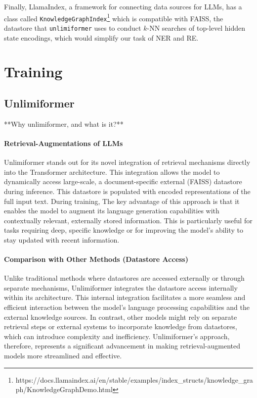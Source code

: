 \documentclass[12pt]{article}
\begin{document}
Finally, LlamaIndex, a framework for connecting data sources for LLMs, has a class called \texttt{KnowledgeGraphIndex}\footnote{https://docs.llamaindex.ai/en/stable/examples/index\_structs/knowledge\_graph/KnowledgeGraphDemo.html} which is compatible with FAISS, the datastore that \texttt{unlimiformer} uses to conduct $k$-NN searches of top-level hidden state encodings, which would simplify our task of NER and RE.

\section{Training}

\subsection*{Unlimiformer}
**Why unlimiformer, and what is it?**

\paragraph{Retrieval-Augmentations of LLMs} Unlimiformer stands out for its novel
integration of retrieval mechanisms directly into the Transformer architecture.
This integration allows the model to dynamically access large-scale, a
document-specific external
(FAISS) datastore during inference. This datastore is populated with
encoded representations of the full input text. During training,  The key advantage of this
approach is that it enables the model to augment its language generation
capabilities with contextually relevant, externally stored information. This is
particularly useful for tasks requiring deep, specific knowledge or for
improving the model's ability to stay updated with recent information.

\paragraph{Comparison with Other Methods (Datastore Access)} Unlike traditional
methods where datastores are accessed externally or through separate
mechanisms, Unlimiformer integrates the datastore access internally within its
architecture. This internal integration facilitates a more seamless and
efficient interaction between the model's language processing capabilities and
the external knowledge sources. In contrast, other models might rely on
separate retrieval steps or external systems to incorporate knowledge from
datastores, which can introduce complexity and inefficiency. Unlimiformer's
approach, therefore, represents a significant advancement in making
retrieval-augmented models more streamlined and effective.
\end{document}
